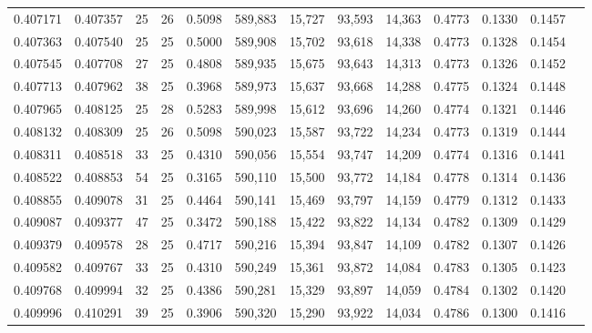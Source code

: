 \begin{tabular}{rrrrrrrrrrrrr}
0.407171 & 0.407357 &    25 &  26 &                                     0.5098 & 589,883 &  15,727 &  93,593 &  14,363 & 0.4773 & 0.1330 & 0.1457 \\
0.407363 & 0.407540 &    25 &  25 &                                     0.5000 & 589,908 &  15,702 &  93,618 &  14,338 & 0.4773 & 0.1328 & 0.1454 \\
0.407545 & 0.407708 &    27 &  25 &                                     0.4808 & 589,935 &  15,675 &  93,643 &  14,313 & 0.4773 & 0.1326 & 0.1452 \\
0.407713 & 0.407962 &    38 &  25 &                                     0.3968 & 589,973 &  15,637 &  93,668 &  14,288 & 0.4775 & 0.1324 & 0.1448 \\
0.407965 & 0.408125 &    25 &  28 &                                     0.5283 & 589,998 &  15,612 &  93,696 &  14,260 & 0.4774 & 0.1321 & 0.1446 \\
0.408132 & 0.408309 &    25 &  26 &                                     0.5098 & 590,023 &  15,587 &  93,722 &  14,234 & 0.4773 & 0.1319 & 0.1444 \\
0.408311 & 0.408518 &    33 &  25 &                                     0.4310 & 590,056 &  15,554 &  93,747 &  14,209 & 0.4774 & 0.1316 & 0.1441 \\
0.408522 & 0.408853 &    54 &  25 &                                     0.3165 & 590,110 &  15,500 &  93,772 &  14,184 & 0.4778 & 0.1314 & 0.1436 \\
0.408855 & 0.409078 &    31 &  25 &                                     0.4464 & 590,141 &  15,469 &  93,797 &  14,159 & 0.4779 & 0.1312 & 0.1433 \\
0.409087 & 0.409377 &    47 &  25 &                                     0.3472 & 590,188 &  15,422 &  93,822 &  14,134 & 0.4782 & 0.1309 & 0.1429 \\
0.409379 & 0.409578 &    28 &  25 &                                     0.4717 & 590,216 &  15,394 &  93,847 &  14,109 & 0.4782 & 0.1307 & 0.1426 \\
0.409582 & 0.409767 &    33 &  25 &                                     0.4310 & 590,249 &  15,361 &  93,872 &  14,084 & 0.4783 & 0.1305 & 0.1423 \\
0.409768 & 0.409994 &    32 &  25 &                                     0.4386 & 590,281 &  15,329 &  93,897 &  14,059 & 0.4784 & 0.1302 & 0.1420 \\
0.409996 & 0.410291 &    39 &  25 &                                     0.3906 & 590,320 &  15,290 &  93,922 &  14,034 & 0.4786 & 0.1300 & 0.1416 \\

\end{tabular}
